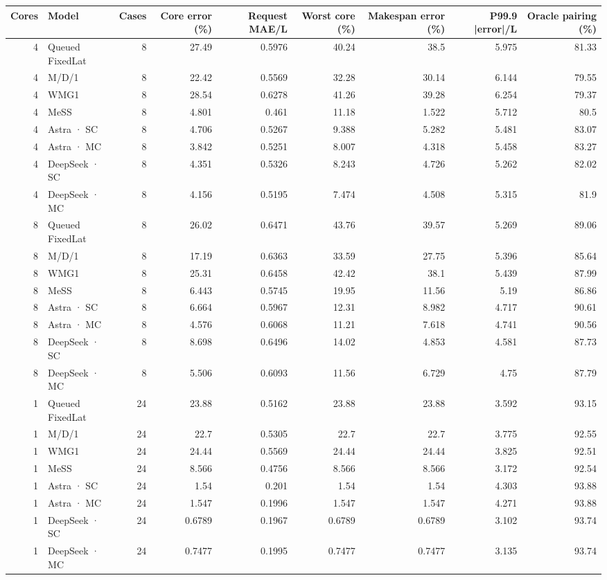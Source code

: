 \begin{tabular}{rlrrrrrrr}
\toprule
Cores & Model & Cases & Core error (\%) & Request MAE/L & Worst core (\%) & Makespan error (\%) & P99.9 |error|/L & Oracle pairing (\%) \\
\midrule
4 & Queued FixedLat & 8 & 27.49 & 0.5976 & 40.24 & 38.5 & 5.975 & 81.33 \\
4 & M/D/1 & 8 & 22.42 & 0.5569 & 32.28 & 30.14 & 6.144 & 79.55 \\
4 & WMG1 & 8 & 28.54 & 0.6278 & 41.26 & 39.28 & 6.254 & 79.37 \\
4 & MeSS & 8 & 4.801 & 0.461 & 11.18 & 1.522 & 5.712 & 80.5 \\
4 & Astra · SC & 8 & 4.706 & 0.5267 & 9.388 & 5.282 & 5.481 & 83.07 \\
4 & Astra · MC & 8 & 3.842 & 0.5251 & 8.007 & 4.318 & 5.458 & 83.27 \\
4 & DeepSeek · SC & 8 & 4.351 & 0.5326 & 8.243 & 4.726 & 5.262 & 82.02 \\
4 & DeepSeek · MC & 8 & 4.156 & 0.5195 & 7.474 & 4.508 & 5.315 & 81.9 \\
8 & Queued FixedLat & 8 & 26.02 & 0.6471 & 43.76 & 39.57 & 5.269 & 89.06 \\
8 & M/D/1 & 8 & 17.19 & 0.6363 & 33.59 & 27.75 & 5.396 & 85.64 \\
8 & WMG1 & 8 & 25.31 & 0.6458 & 42.42 & 38.1 & 5.439 & 87.99 \\
8 & MeSS & 8 & 6.443 & 0.5745 & 19.95 & 11.56 & 5.19 & 86.86 \\
8 & Astra · SC & 8 & 6.664 & 0.5967 & 12.31 & 8.982 & 4.717 & 90.61 \\
8 & Astra · MC & 8 & 4.576 & 0.6068 & 11.21 & 7.618 & 4.741 & 90.56 \\
8 & DeepSeek · SC & 8 & 8.698 & 0.6496 & 14.02 & 4.853 & 4.581 & 87.73 \\
8 & DeepSeek · MC & 8 & 5.506 & 0.6093 & 11.56 & 6.729 & 4.75 & 87.79 \\
1 & Queued FixedLat & 24 & 23.88 & 0.5162 & 23.88 & 23.88 & 3.592 & 93.15 \\
1 & M/D/1 & 24 & 22.7 & 0.5305 & 22.7 & 22.7 & 3.775 & 92.55 \\
1 & WMG1 & 24 & 24.44 & 0.5569 & 24.44 & 24.44 & 3.825 & 92.51 \\
1 & MeSS & 24 & 8.566 & 0.4756 & 8.566 & 8.566 & 3.172 & 92.54 \\
1 & Astra · SC & 24 & 1.54 & 0.201 & 1.54 & 1.54 & 4.303 & 93.88 \\
1 & Astra · MC & 24 & 1.547 & 0.1996 & 1.547 & 1.547 & 4.271 & 93.88 \\
1 & DeepSeek · SC & 24 & 0.6789 & 0.1967 & 0.6789 & 0.6789 & 3.102 & 93.74 \\
1 & DeepSeek · MC & 24 & 0.7477 & 0.1995 & 0.7477 & 0.7477 & 3.135 & 93.74 \\
\bottomrule
\end{tabular}
